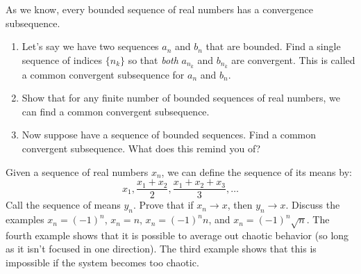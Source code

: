   \begin{exercise}
    As we know, every bounded sequence of real numbers has a convergence subsequence.
    \begin{enumerate}
      \item Let's say we have two sequences $a_n$ and $b_n$ that are bounded. Find a single sequence of indices $\{n_k\}$ so that \emph{both} $a_{n_k}$ and $b_{n_k}$ are convergent. This is called a common convergent subsequence for $a_n$ and $b_n$.
      
      \item Show that for any finite number of bounded sequences of real numbers, we can find a common convergent subsequence.
      
      \item Now suppose have a sequence of bounded sequences. Find a common convergent subsequence. What does this remind you of?
    \end{enumerate}
  \end{exercise}
  \begin{solution}
    
  \end{solution}

  \begin{exercise}
    Given a sequence of real numbers $x_n$, we can define the sequence of its means by:
    \begin{equation}
      x_1, \frac{x_1 + x_2}{2}, \frac{x_1 + x_2 + x_3}{3}, \ldots
    \end{equation}
    Call the sequence of means $y_n$. Prove that if $x_n \to x$, then $y_n \to x$. Discuss the examples $x_n = (-1)^n$, $x_n = n$, $x_n = (-1)^n n$, and $x_n = (-1)^n\sqrt{n}$. The fourth example shows that it is possible to average out chaotic behavior (so long as it isn't focused in one direction). The third example shows that this is impossible if the system becomes too chaotic.
  \end{exercise}
  \begin{solution}
    
  \end{solution}


